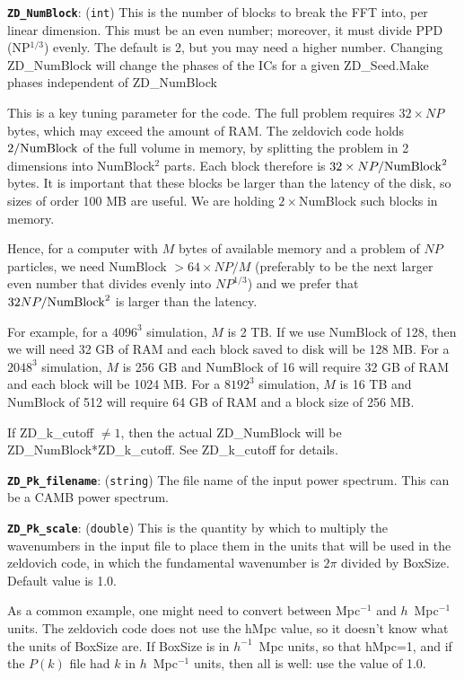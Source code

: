 \documentclass[11pt,preprint]{aastex}
\newcommand{\param}[2]{\medskip\noindent\textbf{\texttt{#1}}: ({\tt #2}) }
\newcommand{\todo}{}
\newcommand{\todo}[1]{{\bf TODO: #1}}
\begin{document}
\param{ZD\_NumBlock}{int} This is the number of blocks to break the FFT
into, per linear dimension.  This must be an even number; moreover,
it must divide PPD (NP$^{1/3}$) evenly.  The default is 2, but you
may need a higher number.  Changing ZD\_NumBlock will change the
phases of the ICs for a given ZD\_Seed.\todo{Make phases independent
of ZD\_NumBlock}

This is a key tuning parameter for the code.  The full problem
requires $32\times NP$ bytes, which may exceed the amount of RAM.
The zeldovich code holds $2/{\rm NumBlock}$ of the full volume in memory,
by splitting the problem in 2 dimensions into NumBlock$^2$ parts.
Each block therefore is $32\times NP/{\rm NumBlock}^2$ bytes.  It
is important that these blocks be larger than the latency of the
disk, so sizes of order 100 MB are useful.  We are holding
$2\times$NumBlock such blocks in memory.

Hence, for a computer with $M$ bytes of available memory and a
problem of $NP$ particles, we need NumBlock $>64\times NP/M$
(preferably to be the next larger even number that divides evenly
into $NP^{1/3}$) and we prefer that $32 NP/{\rm NumBlock}^2$ is 
larger than the latency.

For example, for a $4096^3$ simulation, $M$ is 2 TB.  If we use
NumBlock of 128, then we will need 32 GB of RAM and each block saved
to disk will be 128 MB.  For a $2048^3$ simulation, $M$ is 256 GB
and NumBlock of 16 will require 32 GB of RAM and each block will
be 1024 MB.  For a $8192^3$ simulation, $M$ is 16 TB and NumBlock
of 512 will require 64 GB of RAM and a block size of 256 MB.

If ZD\_k\_cutoff $\ne 1$, then the actual ZD\_NumBlock will be ZD\_NumBlock*ZD\_k\_cutoff.
See ZD\_k\_cutoff for details.


\param{ZD\_Pk\_filename}{string} The file name of the input power spectrum.  This can be a CAMB power spectrum.

\param{ZD\_Pk\_scale}{double} This is the quantity by which to multiply the 
wavenumbers in the input file to place them in the units that will be used
in the zeldovich code, in which the fundamental wavenumber is $2\pi$ divided
by BoxSize.  Default value is 1.0.

As a common example, one might need to convert between Mpc$^{-1}$ and
$h$~Mpc$^{-1}$ units.  The zeldovich code does not use the hMpc value,
so it doesn't know what the units of BoxSize are.  If BoxSize is in 
$h^{-1}$~Mpc units, so that hMpc=1, and if the $P(k)$ file had $k$
in $h$~Mpc$^{-1}$ units, then all is well: use the value of 1.0.
\end{document}
